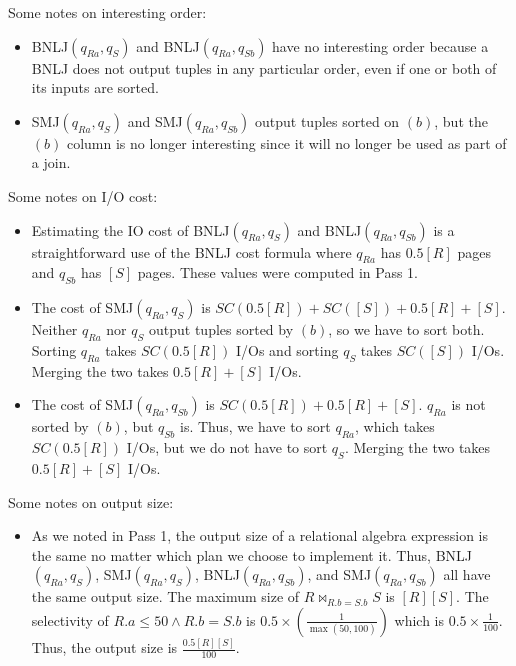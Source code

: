 \documentclass{article}
\begin{document}
Some notes on interesting order:
\begin{itemize}
  \item
    BNLJ$(q_{Ra}, q_{S})$ and BNLJ$(q_{Ra}, q_{Sb})$ have no interesting order
    because a BNLJ does not output tuples in any particular order, even if one
    or both of its inputs are sorted.
  \item
    SMJ$(q_{Ra}, q_{S})$ and SMJ$(q_{Ra}, q_{Sb})$ output tuples sorted on
    $(b)$, but the $(b)$ column is no longer interesting since it will no
    longer be used as part of a join.
\end{itemize}

Some notes on I/O cost:
\begin{itemize}
  \item
    Estimating the IO cost of BNLJ$(q_{Ra}, q_{S})$ and BNLJ$(q_{Ra}, q_{Sb})$
    is a straightforward use of the BNLJ cost formula where $q_{Ra}$ has
    $0.5[R]$ pages and $q_{Sb}$ has $[S]$ pages. These values were computed in
    Pass 1.

  \item
    The cost of SMJ$(q_{Ra}, q_{S})$ is $SC(0.5[R]) + SC([S]) + 0.5[R] + [S]$.
    Neither $q_{Ra}$ nor $q_S$ output tuples sorted by $(b)$, so we have to
    sort both. Sorting $q_{Ra}$ takes $SC(0.5[R])$ I/Os and sorting $q_S$ takes
    $SC([S])$ I/Os. Merging the two takes $0.5[R] + [S]$ I/Os.

  \item
    The cost of SMJ$(q_{Ra}, q_{Sb})$ is $SC(0.5[R]) + 0.5[R] + [S]$.  $q_{Ra}$
    is not sorted by $(b)$, but $q_{Sb}$ is. Thus, we have to sort $q_{Ra}$,
    which takes $SC(0.5[R])$ I/Os, but we do not have to sort $q_S$.  Merging
    the two takes $0.5[R] + [S]$ I/Os.
\end{itemize}

Some notes on output size:
\begin{itemize}
  \item
    As we noted in Pass 1, the output size of a relational algebra expression
    is the same no matter which plan we choose to implement it. Thus,
    BNLJ$(q_{Ra}, q_{S})$, SMJ$(q_{Ra}, q_{S})$, BNLJ$(q_{Ra}, q_{Sb})$, and
    SMJ$(q_{Ra}, q_{Sb})$ all have the same output size. The maximum size of $R
    \bowtie_{R.b=S.b} S$ is $[R][S]$. The selectivity of $R.a \leq 50 \land
    R.b=S.b$ is $0.5 \times (\frac{1}{\max(50, 100)})$ which is $0.5 \times
    \frac{1}{100}$.  Thus, the output size is $\frac{0.5[R][S]}{100}$.
\end{itemize}
\end{document}
